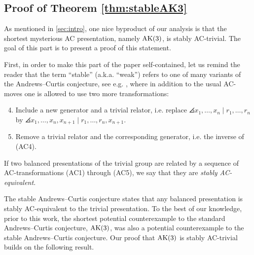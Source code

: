 
\subsection{Proof of Theorem \ref{thm:stableAK3}}
\label{sec:stable_ak3}


As mentioned in \autoref{sec:intro}, one nice byproduct of our analysis is that the shortest mysterious AC presentation, namely $\text{AK}(3)$, is stably AC-trivial. The goal of this part is to present a proof of this statement.

First, in order to make this part of the paper self-contained, let us remind the reader that the term ``stable'' (a.k.a. ``weak'') refers to one of many variants of the Andrews--Curtis conjecture, see e.g. \cite{MMS,Meier2016,Bagherifard2021}, where in addition to the usual AC-moves one is allowed to use two more transformations:
\begin{enumerate}[label=(AC\arabic*)]
	\setcounter{enumi}{3}
	\item Include a new generator and a trivial relator, i.e. replace $\angles{x_1, \dots, x_n \mid r_1, \dots, r_n}$ by $\angles{x_1, \dots, x_n, x_{n+1} \mid r_1, \dots, r_n, x_{n+1}}$.
	\item Remove a trivial relator and the corresponding generator, i.e. the inverse of (AC4).
\end{enumerate}

\begin{definition}
If two balanced presentations of the trivial group are related by a sequence of AC-transformations (AC1) through (AC5), we say that they are \textit{stably AC-equivalent}.
\end{definition}
The stable Andrews--Curtis conjecture states that any balanced presentation is stably AC-equivalent to the trivial presentation.
To the best of our knowledge, prior to this work, the shortest potential counterexample to the standard Andrews--Curtis conjecture, $\text{AK}(3)$, was also a potential counterexample to the stable Andrews--Curtis conjecture. Our proof that $\text{AK}(3)$ is stably AC-trivial builds on the following result.

